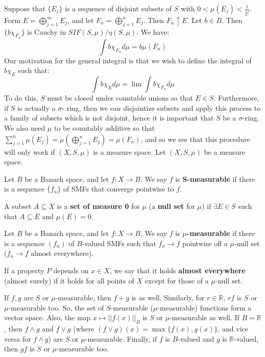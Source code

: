	Suppose that $\{E_j\}$ is a sequence of disjoint subsets of $S$ with $0 < \mu(E_j) < \frac{1}{2^j}$. Form $E = 
	\bigoplus_{j = 1}^\infty E_j$, and let $F_n = \bigoplus_{j = 1}^n E_j$. Then $F_n\uparrow E$. Let $b\in B$. Then 
	$\{b\chi_{F_n}\}$ is Cauchy in $SIF(S, \mu) / \eta(S, \mu)$. We have:
	$$
		\int b\chi_{F_n}d\mu = b\mu(F_n)
	$$
	Our motivation for the general integral is that we wish to define the integral of $b\chi_E$ such that:
	$$
		\int b\chi_Ed\mu = \lim\int b\chi_{F_n}d\mu
	$$
	To do this, $S$ must be closed under countable unions so that $E\in S$. Furthermore, if $S$ is actually a $\sigma$-
	ring, then we can disjointize subsets and apply this process to a family of subsets which is not disjoint, hence it is 
	important that $S$ be a $\sigma$-ring. We also need $\mu$ to be countably additive so that $\sum_{j = 1}^n\mu(E_j) = 
	\mu(\bigoplus_{j =1}^n E_j) = \mu(F_n)$, and so we see that this procedure will only work if $(X, S, \mu)$ is a measure 
	space. Let $(X, S, \mu)$ be a measure space.
	
	\begin{definition}
		Let $B$ be a Banach space, and let $f : X\rightarrow B$. We say $f$ is \textbf{S-measurable} if there is a sequence 
		$\{f_n\}$ of SMFs that converge pointwise to $f$. 
	\end{definition}
	
	\begin{definition}
		A subset $A\subseteq X$ is a \textbf{set of measure 0} for $\mu$ (a \textbf{null set} for $\mu$) if $\exists E\in S$ 
		such that $A\subseteq E$ and $\mu(E) = 0$. 
	\end{definition}
	
	\begin{definition}
		Let $B$ be a Banach space, and let $f : X\rightarrow B$. We say $f$ is \textbf{$\mu$-measurable} if there is a 
		sequence $(f_n)$ of $B$-valued SMFs such that $f_n\rightarrow f$ pointwise off a $\mu$-null set ($f_n\rightarrow 
		f$ almost everywhere).
	\end{definition}
	
	\begin{definition}
		If a property $P$ depends on $x\in X$, we say that it holds \textbf{almost everywhere} (almost surely) if it holds 
		for all points of $X$ except for those of a $\mu$-null set.
	\end{definition}
	
	If $f, g$ are $S$ or $\mu$-measurable, then $f + g$ is as well. Similarly, for $r\in\mathbb R$, $rf$ is $S$ or 
	$\mu$-measurable too. So, the set of $S$-measurable ($\mu$-measurable) functions form a vector space. 
	Also, the map $x\mapsto ||f(x)||_B$ is $S$ or $\mu$-measurable as well. If $B = \mathbb R$, then $f\wedge g$ and 
	$f\vee g$ (where $(f\vee g)(x) = \max\{f(x), g(x)\}$, and vice versa for $f\wedge g$) are $S$ or $\mu$-measurable. 
	Finally, if $f$ is $B$-valued and $g$ is $\mathbb R$-valued, then $gf$ is $S$ or $\mu$-measurable too.
	
